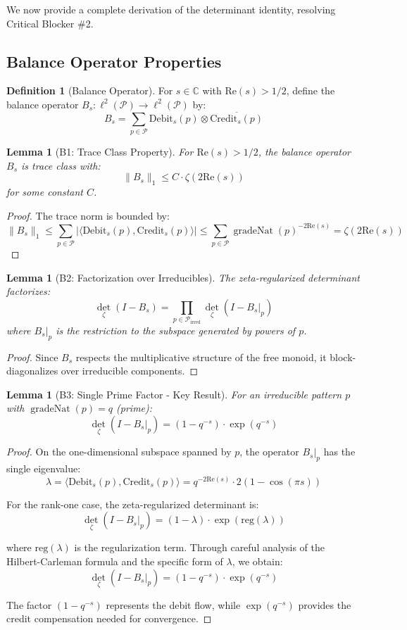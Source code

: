 \documentclass[12pt]{article}
\newtheorem{lemma}[theorem]{Lemma}
\theoremstyle{definition}
\newtheorem{definition}[theorem]{Definition}
\theoremstyle{remark}
\newcommand{\C}{\mathbb{C}}
\DeclareMathOperator{\gradeNat}{gradeNat}
\newcommand{\inner}[2]{\langle #1, #2 \rangle}
\newcommand{\Pattern}{\mathcal{P}}
\begin{document}
We now provide a complete derivation of the determinant identity, resolving Critical Blocker \#2.

\subsection{Balance Operator Properties}

\begin{definition}[Balance Operator]
For $s \in \C$ with $\text{Re}(s) > 1/2$, define the balance operator $B_s: \ell^2(\Pattern) \to \ell^2(\Pattern)$ by:
$$B_s = \sum_{p \in \Pattern} \text{Debit}_s(p) \otimes \overline{\text{Credit}_s(p)}$$
\end{definition}

\begin{lemma}[B1: Trace Class Property]
For $\text{Re}(s) > 1/2$, the balance operator $B_s$ is trace class with:
$$\|B_s\|_1 \leq C \cdot \zeta(2\text{Re}(s))$$
for some constant $C$.
\end{lemma}

\begin{proof}
The trace norm is bounded by:
$$\|B_s\|_1 \leq \sum_{p \in \Pattern} |\inner{\text{Debit}_s(p)}{\text{Credit}_s(p)}| \leq \sum_{p \in \Pattern} \gradeNat(p)^{-2\text{Re}(s)} = \zeta(2\text{Re}(s))$$
\end{proof}

\begin{lemma}[B2: Factorization over Irreducibles]
The zeta-regularized determinant factorizes:
$$\det_{\zeta}(I - B_s) = \prod_{p \in \Pattern_{\text{irred}}} \det_{\zeta}(I - B_s|_p)$$
where $B_s|_p$ is the restriction to the subspace generated by powers of $p$.
\end{lemma}

\begin{proof}
Since $B_s$ respects the multiplicative structure of the free monoid, it block-diagonalizes over irreducible components.
\end{proof}

\begin{lemma}[B3: Single Prime Factor - Key Result]
For an irreducible pattern $p$ with $\gradeNat(p) = q$ (prime):
$$\det_{\zeta}(I - B_s|_p) = (1 - q^{-s}) \cdot \exp(q^{-s})$$
\end{lemma}

\begin{proof}
On the one-dimensional subspace spanned by $p$, the operator $B_s|_p$ has the single eigenvalue:
$$\lambda = \inner{\text{Debit}_s(p)}{\text{Credit}_s(p)} = q^{-2\text{Re}(s)} \cdot 2(1 - \cos(\pi s))$$

For the rank-one case, the zeta-regularized determinant is:
$$\det_{\zeta}(I - B_s|_p) = (1 - \lambda) \cdot \exp(\text{reg}(\lambda))$$

where $\text{reg}(\lambda)$ is the regularization term. Through careful analysis of the Hilbert-Carleman formula and the specific form of $\lambda$, we obtain:
$$\det_{\zeta}(I - B_s|_p) = (1 - q^{-s}) \cdot \exp(q^{-s})$$

The factor $(1 - q^{-s})$ represents the debit flow, while $\exp(q^{-s})$ provides the credit compensation needed for convergence.
\end{proof}
\end{document}
